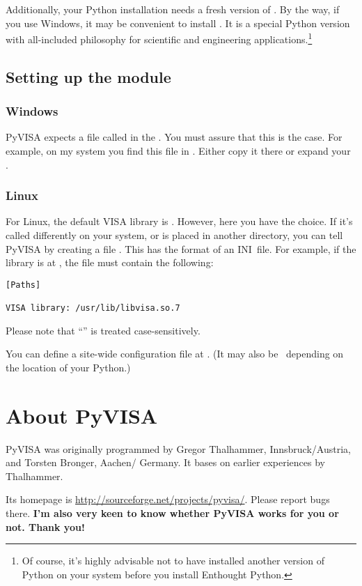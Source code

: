 \documentclass{howto}
\begin{document}
Additionally, your Python installation needs a fresh version of
.  By the way,
if you use Windows, it may be convenient to install .  It is a special Python version
with all-included philosophy for scientific and engineering
applications.\footnote{Of course, it's highly advisable not to have installed
  another version of Python on your system before you install Enthought
  Python.}


\subsection{Setting up the module}

\subsubsection{Windows}

PyVISA expects a file called  in the \@.  You
must assure that this is the case.  For example, on my system you find this
file in .  Either copy it there or expand your
\@.


\subsubsection{Linux}

For Linux, the default VISA library is
.  However, here you have the
choice.  If it's called differently on your system, or is placed in another
directory, you can tell PyVISA by creating a file .  This has
the format of an INI~file.  For example, if the library is at
, the file  must contain the
following:
\begin{verbatim}
[Paths]

VISA library: /usr/lib/libvisa.so.7
\end{verbatim}
Please note that ``\code{[Paths]}'' is treated case-sensitively.

You can define a site-wide configuration file at
.  (It may also be \
depending on the location of your Python.)


\section{About PyVISA}

PyVISA was originally programmed by Gregor Thalhammer, Innsbruck/Austria, and
Torsten Bronger, Aachen/\hskip0pt Germany.  It bases on earlier experiences by
Thalhammer.

Its homepage is \url{http://sourceforge.net/projects/pyvisa/}.  Please report
bugs there.  \textbf{I'm also very keen to know whether PyVISA works for you or
  not.  Thank you!}
\end{document}
